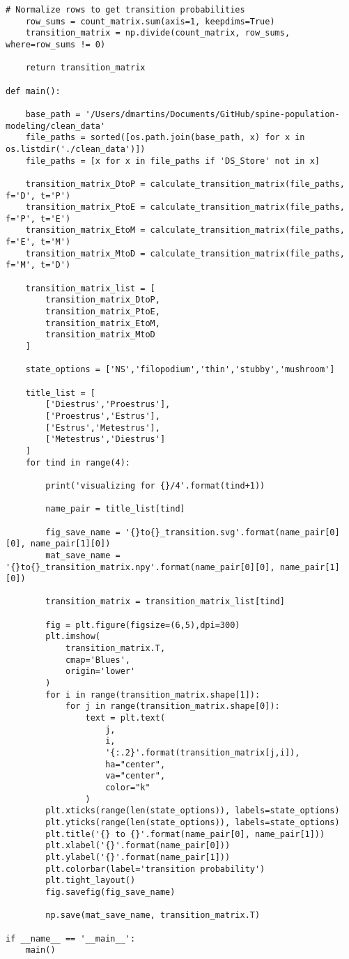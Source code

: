 \documentclass[11pt]{article}
\begin{document}
\begin{Verbatim}[frame=single]
    # Normalize rows to get transition probabilities
    row_sums = count_matrix.sum(axis=1, keepdims=True)
    transition_matrix = np.divide(count_matrix, row_sums, where=row_sums != 0)
    
    return transition_matrix

def main():

    base_path = '/Users/dmartins/Documents/GitHub/spine-population-modeling/clean_data'
    file_paths = sorted([os.path.join(base_path, x) for x in os.listdir('./clean_data')])
    file_paths = [x for x in file_paths if 'DS_Store' not in x]

    transition_matrix_DtoP = calculate_transition_matrix(file_paths, f='D', t='P')
    transition_matrix_PtoE = calculate_transition_matrix(file_paths, f='P', t='E')
    transition_matrix_EtoM = calculate_transition_matrix(file_paths, f='E', t='M')
    transition_matrix_MtoD = calculate_transition_matrix(file_paths, f='M', t='D')

    transition_matrix_list = [
        transition_matrix_DtoP,
        transition_matrix_PtoE,
        transition_matrix_EtoM,
        transition_matrix_MtoD
    ]

    state_options = ['NS','filopodium','thin','stubby','mushroom']

    title_list = [
        ['Diestrus','Proestrus'],
        ['Proestrus','Estrus'],
        ['Estrus','Metestrus'],
        ['Metestrus','Diestrus']
    ]
    for tind in range(4):

        print('visualizing for {}/4'.format(tind+1))

        name_pair = title_list[tind]

        fig_save_name = '{}to{}_transition.svg'.format(name_pair[0][0], name_pair[1][0])
        mat_save_name = '{}to{}_transition_matrix.npy'.format(name_pair[0][0], name_pair[1][0])

        transition_matrix = transition_matrix_list[tind]

        fig = plt.figure(figsize=(6,5),dpi=300)
        plt.imshow(
            transition_matrix.T,
            cmap='Blues',
            origin='lower'
        )
        for i in range(transition_matrix.shape[1]):
            for j in range(transition_matrix.shape[0]):
                text = plt.text(
                    j,
                    i,
                    '{:.2}'.format(transition_matrix[j,i]),
                    ha="center",
                    va="center",
                    color="k"
                )
        plt.xticks(range(len(state_options)), labels=state_options)
        plt.yticks(range(len(state_options)), labels=state_options)
        plt.title('{} to {}'.format(name_pair[0], name_pair[1]))
        plt.xlabel('{}'.format(name_pair[0]))
        plt.ylabel('{}'.format(name_pair[1]))
        plt.colorbar(label='transition probability')
        plt.tight_layout()
        fig.savefig(fig_save_name)

        np.save(mat_save_name, transition_matrix.T)

if __name__ == '__main__':
    main()
\end{Verbatim}
\end{document}
